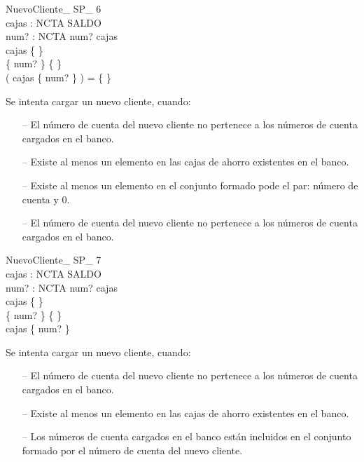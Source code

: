 \begin{schema}{NuevoCliente\_ SP\_ 6}\\
 cajas : NCTA \pfun SALDO \\
 num? : NCTA 
\where
 num? \notin \dom cajas \\
 cajas \neq \{ \} \\
 \{ num?  \} \neq \{ \} \\
 ( \dom cajas \cap \dom \{ num?  \} ) = \{ \}
\end{schema}

\begin{tcolorbox}[colback=gray!5!white,colframe=gray!50!black,
  colbacktitle=gray!75!black,title=NuevoCliente\_SP\_6]
  Se intenta cargar un nuevo cliente, cuando:
     \begin{itemize}
        \item[--]{El número de cuenta del nuevo cliente no pertenece a los números de cuenta cargados en el banco.}
        \item[--]{Existe al menos un elemento en las cajas de ahorro existentes en el banco.}
        \item[--]{Existe al menos un elemento en el conjunto formado pode el par: número de cuenta y 0.}
        \item[--]{El número de cuenta del nuevo cliente no pertenece a los números de cuenta cargados en el banco.}
     \end{itemize}
\end{tcolorbox}


\begin{schema}{NuevoCliente\_ SP\_ 7}\\
 cajas : NCTA \pfun SALDO \\
 num? : NCTA 
\where
 num? \notin \dom cajas \\
 cajas \neq \{ \} \\
 \{ num?  \} \neq \{ \} \\
 \dom cajas \subset \dom \{ num?  \}
\end{schema}

\begin{tcolorbox}[colback=gray!5!white,colframe=gray!50!black,
  colbacktitle=gray!75!black,title=NuevoCliente\_SP\_7]
  Se intenta cargar un nuevo cliente, cuando:
     \begin{itemize}
        \item[--]{El número de cuenta del nuevo cliente no pertenece a los números de cuenta cargados en el banco.}
        \item[--]{Existe al menos un elemento en las cajas de ahorro existentes en el banco.}
        \item[--]{Los números de cuenta cargados en el banco están incluidos en el conjunto formado por el número de cuenta del nuevo cliente.}
     \end{itemize}
\end{tcolorbox}


